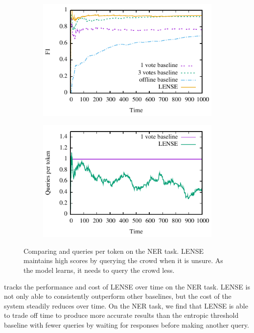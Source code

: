 \begin{figure}[t]
  \centering
  \begin{subfigure}[b]{0.49\textwidth}
  \includegraphics[width=\textwidth]{figures/ner_2_class/f1_plot/f1_vs_time.pdf}
\end{subfigure}
  \begin{subfigure}[b]{0.49\textwidth}
  \includegraphics[width=\textwidth]{figures/ner_2_class/cost_plot/cost_vs_time.pdf}
  \end{subfigure}
  \caption{Comparing \fone{} and queries per token on the NER task. LENSE maintains high \fone{} scores by querying the crowd when it is unsure. As the model learns, it needs to query the crowd less.}
\label{fig:ner-f1}
\end{figure}

 tracks the performance and cost of LENSE over time on the NER task.
LENSE is not only able  to consistently outperform other baselines, but the cost of the system steadily reduces over time.
On the NER task, we find that LENSE is able to trade off time to produce more accurate results than the entropic threshold baseline with fewer queries by waiting for responses before making another query.

